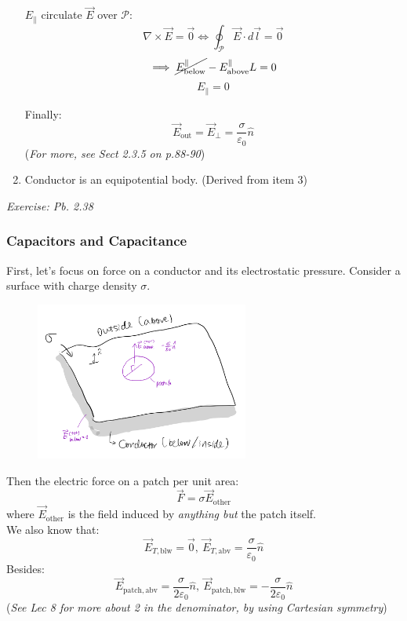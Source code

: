 \documentclass[12pt,a4paper,twoside]{article}
\begin{document}
\begin{enumerate}
        $E_{\parallel}$ circulate $\overrightarrow{E}$ over $\mathcal{P}$:
        \[\nabla\times \overrightarrow{E}=\overrightarrow{0}\iff \oint_{\mathcal{P}}\overrightarrow{E}\cdot d\overrightarrow{l}=\overrightarrow{0}\]
        \[\implies \cancel{E^{\parallel}_{\mathrm{below}}} - E^{\parallel}_{\mathrm{above}}L=0\]
        \[E_{\parallel}=0\]
        
        Finally:
        \[\overrightarrow{E}_{\mathrm{out}}=\overrightarrow{E}_{\perp}=\frac{\sigma}{\varepsilon_0}\hat{n}\]
        (\textit{For more, see Sect 2.3.5 on p.88-90})
        
        \item Conductor is an equipotential body. (Derived from item 3)
    \end{enumerate}
    \textit{Exercise: Pb. 2.38}

\subsubsection{Capacitors and Capacitance}
    First, let's focus on force on a conductor and its electrostatic pressure. Consider a surface with charge density $\sigma$.
    \begin{figure}[ht]
        \centering
        \includegraphics[width=7cm]{250-Revision/L12-pressure.png}
    \end{figure}
    
    \noindent Then the electric force on a patch per unit area:
    \[\overrightarrow{F}=\sigma \overrightarrow{E}_{\mathrm{other}}\]
    where $\overrightarrow{E}_{\mathrm{other}}$ is the field induced by \textit{anything but} the patch itself.\\
    \newline
    \noindent We also know that:
    \[\overrightarrow{E}_{T,\mathrm{blw}}=\overrightarrow{0},\ \overrightarrow{E}_{T,\mathrm{abv}}=\frac{\sigma }{\varepsilon_0}\hat{n}\]
    Besides:
    \[\overrightarrow{E}_{\mathrm{patch,abv}}=\frac{\sigma}{2\varepsilon_0}\hat{n},\ \overrightarrow{E}_{\mathrm{patch,blw}}=-\frac{\sigma}{2\varepsilon_0}\hat{n}\]
    (\textit{See Lec 8 for more about 2 in the denominator, by using Cartesian symmetry})\\
    
\end{document}
